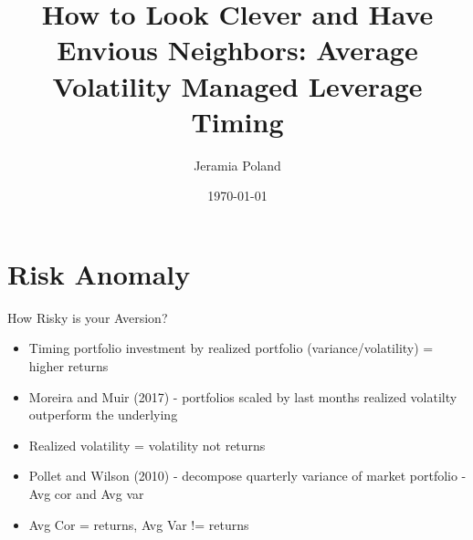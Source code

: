 \documentclass{beamer}
\begin{document}
\title[Average Variance]{How to Look Clever and Have Envious Neighbors: Average
	Volatility Managed Leverage Timing}   
\author[J. Poland]{Jeramia Poland} 
\date{\today}

\begin{frame}
\titlepage
\end{frame}

\section{Risk Anomaly}

\begin{frame}{How Risky is your Aversion?}
	\begin{itemize}[<+->]
		\item Timing portfolio investment by realized portfolio (variance/volatility) = higher returns
		\item Moreira and Muir (2017) - portfolios scaled by last months realized volatilty outperform the underlying
		\item Realized volatility = volatility not returns
		\item Pollet and Wilson (2010) - decompose quarterly variance of market portfolio - Avg cor and Avg var
		\item Avg Cor = returns, Avg Var != returns
	\end{itemize}
\end{frame}
\end{document}
